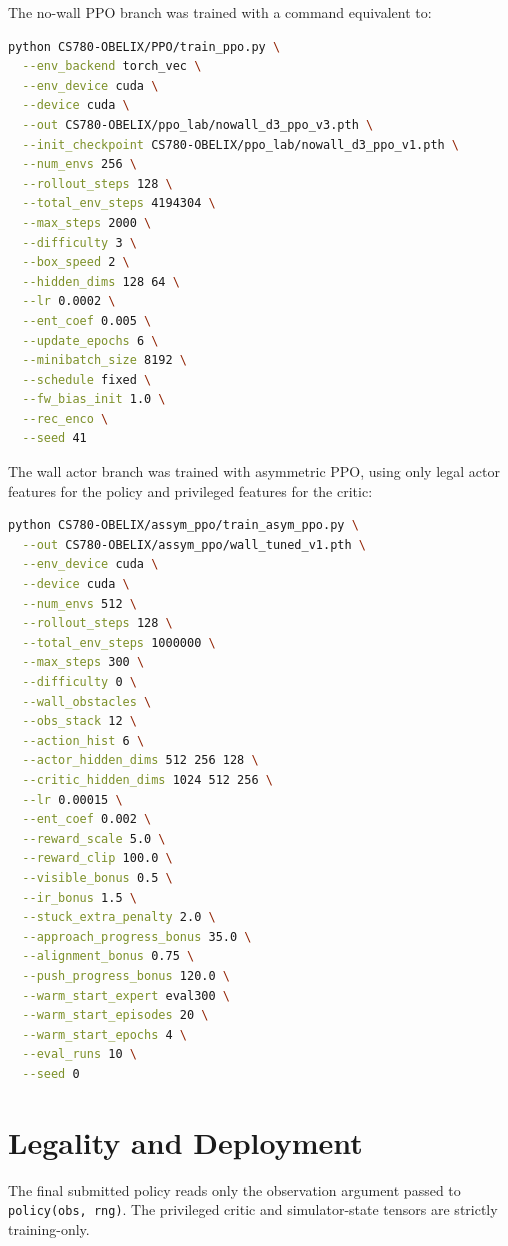 \documentclass[11pt]{article}
\begin{document}
The no-wall PPO branch was trained with a command equivalent to:

\begin{lstlisting}[language=bash]
python CS780-OBELIX/PPO/train_ppo.py \
  --env_backend torch_vec \
  --env_device cuda \
  --device cuda \
  --out CS780-OBELIX/ppo_lab/nowall_d3_ppo_v3.pth \
  --init_checkpoint CS780-OBELIX/ppo_lab/nowall_d3_ppo_v1.pth \
  --num_envs 256 \
  --rollout_steps 128 \
  --total_env_steps 4194304 \
  --max_steps 2000 \
  --difficulty 3 \
  --box_speed 2 \
  --hidden_dims 128 64 \
  --lr 0.0002 \
  --ent_coef 0.005 \
  --update_epochs 6 \
  --minibatch_size 8192 \
  --schedule fixed \
  --fw_bias_init 1.0 \
  --rec_enco \
  --seed 41
\end{lstlisting}

The wall actor branch was trained with asymmetric PPO, using only legal actor features
for the policy and privileged features for the critic:

\begin{lstlisting}[language=bash]
python CS780-OBELIX/assym_ppo/train_asym_ppo.py \
  --out CS780-OBELIX/assym_ppo/wall_tuned_v1.pth \
  --env_device cuda \
  --device cuda \
  --num_envs 512 \
  --rollout_steps 128 \
  --total_env_steps 1000000 \
  --max_steps 300 \
  --difficulty 0 \
  --wall_obstacles \
  --obs_stack 12 \
  --action_hist 6 \
  --actor_hidden_dims 512 256 128 \
  --critic_hidden_dims 1024 512 256 \
  --lr 0.00015 \
  --ent_coef 0.002 \
  --reward_scale 5.0 \
  --reward_clip 100.0 \
  --visible_bonus 0.5 \
  --ir_bonus 1.5 \
  --stuck_extra_penalty 2.0 \
  --approach_progress_bonus 35.0 \
  --alignment_bonus 0.75 \
  --push_progress_bonus 120.0 \
  --warm_start_expert eval300 \
  --warm_start_episodes 20 \
  --warm_start_epochs 4 \
  --eval_runs 10 \
  --seed 0
\end{lstlisting}

\section{Legality and Deployment}

The final submitted policy reads only the observation argument passed to
\texttt{policy(obs, rng)}. The privileged critic and simulator-state tensors are strictly
training-only.
\end{document}
